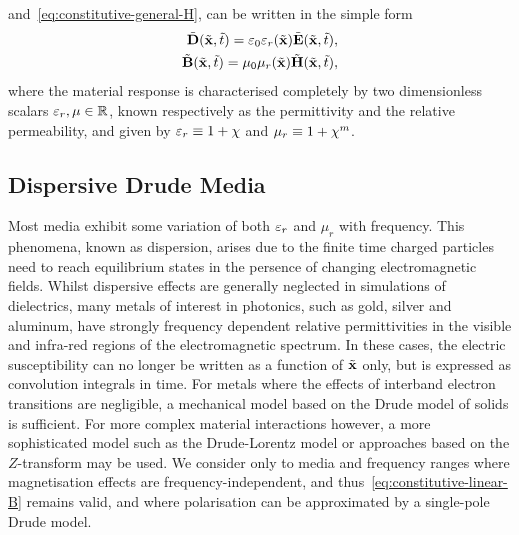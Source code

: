 and~\eqref{eq:constitutive-general-H}, can be written in the simple form
\begin{subequations}
  \label{eq:constitutive-linear}
  \begin{align}
    \tilde{\mathbf{D}}(\tilde{\mathbf{x}},\tilde{t}) = \varepsilon_0 \varepsilon_r(\tilde{\mathbf{x}}) \tilde{\mathbf{E}}(\tilde{\mathbf{x}},\tilde{t}), \label{eq:constitutive-linear-D} \\
    \tilde{\mathbf{B}}(\tilde{\mathbf{x}},\tilde{t}) = \mu_0 \mu_r(\tilde{\mathbf{x}}) \tilde{\mathbf{H}}(\tilde{\mathbf{x}},\tilde{t}),\label{eq:constitutive-linear-B}
  \end{align}
\end{subequations}
where the material response is characterised completely by two dimensionless
scalars $ \varepsilon_r, \mu \in \mathbb{R}$, known respectively as the permittivity and the
relative permeability, and given by $\varepsilon_r \equiv 1 + \chi $ and $\mu_r
\equiv 1 + \chi^{m} $.

\subsection{Dispersive Drude Media}
Most media exhibit some variation of both $\varepsilon_r$ and $\mu_r$ with frequency. This
phenomena, known as dispersion, arises due to the finite time charged particles
need to reach equilibrium states in the persence of changing electromagnetic fields.
Whilst dispersive effects are generally neglected in simulations of dielectrics, many metals of
interest in photonics, such as gold, silver and aluminum, have strongly
frequency dependent relative permittivities in the visible and infra-red regions
of the electromagnetic spectrum\cite{Ordal:1983bg}. In these
cases, the electric susceptibility can no longer be written as a function of
$\tilde{\mathbf{x}}$ only, but is expressed as convolution integrals in time\cite{Jackson:490457}.
For metals where the effects of interband electron transitions are negligible, a
mechanical model based on the Drude model of solids is
sufficient\cite{taflove2013advances}. For more complex material interactions
however, a more sophisticated model such as the Drude-Lorentz
model\cite{Fox:2001wm,Taflove:1989ds} or approaches based on the
$Z$-transform\cite{sullivan1996z} may be used. We consider only
to media and frequency ranges where magnetisation effects are
frequency-independent, and thus~\eqref{eq:constitutive-linear-B} remains valid,
and where polarisation can be approximated by a single-pole Drude model.

